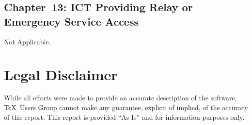 \documentclass{report}
\begin{document}
\subsection{Chapter~13: ICT Providing Relay or Emergency Service
  Access}
\label{sec:EN301-13}

Not Applicable.


\clearpage

\section{Legal Disclaimer}
\label{sec:legal}

While all efforts were made to provide an accurate description of the
software, \TeX\ Users Group cannot make any guarantee, explicit of
implied, of the accuracy of this report.  This report is provided ``As
Is'' and for information purposes only.
\end{document}
